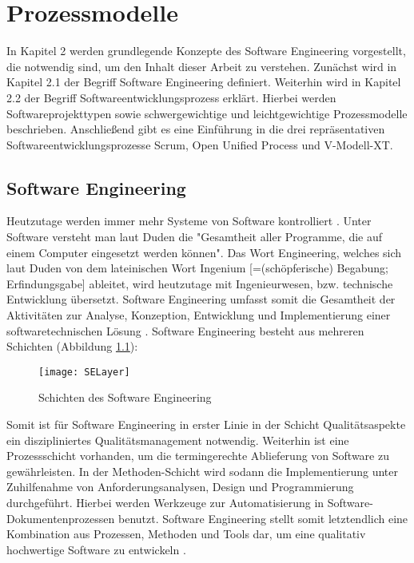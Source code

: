 \chapter{Prozessmodelle}\label{sec:chapter2}

In Kapitel 2 werden grundlegende Konzepte des Software Engineering vorgestellt, die notwendig sind, um den Inhalt dieser Arbeit zu verstehen. Zunächst wird in Kapitel 2.1 der Begriff Software Engineering definiert. Weiterhin wird in Kapitel 2.2 der Begriff Softwareentwicklungsprozess erklärt. Hierbei werden Softwareprojekttypen sowie schwergewichtige und leichtgewichtige Prozessmodelle beschrieben. Anschließend gibt es eine Einführung in die drei repräsentativen Softwareentwicklungsprozesse Scrum, Open Unified Process und V-Modell-XT.

\section{Software Engineering}\label{sec:chapter2: Software Engineering}
Heutzutage werden immer mehr Systeme von Software kontrolliert \cite{Puntambekar2007}. Unter Software versteht man laut Duden die "Gesamtheit aller Programme, die auf einem Computer eingesetzt werden können". Das Wort Engineering, welches sich laut Duden von dem lateinischen Wort Ingenium [=(schöpferische) Begabung; Erfindungsgabe] ableitet, wird heutzutage mit Ingenieurwesen, bzw. technische Entwicklung übersetzt. Software Engineering umfasst somit die Gesamtheit der Aktivitäten zur Analyse, Konzeption, Entwicklung und Implementierung einer softwaretechnischen Lösung \cite{Specker1998}.
Software Engineering besteht aus mehreren Schichten (Abbildung \ref{fig:SchichtenSE}):

\begin{figure}[htp]
\begin{center}
  \texttt{[image: SELayer]} %
  \caption{Schichten des Software Engineering \cite{Puntambekar2007}}
  \label{fig:SchichtenSE}
\end{center}
\end{figure}

Somit ist für Software Engineering in erster Linie in der Schicht Qualitätsaspekte ein diszipliniertes Qualitätsmanagement notwendig. Weiterhin ist eine Prozessschicht vorhanden, um die termingerechte Ablieferung von Software zu gewährleisten. In der Methoden-Schicht wird sodann die Implementierung unter Zuhilfenahme von Anforderungsanalysen, Design und Programmierung durchgeführt. Hierbei werden Werkzeuge zur Automatisierung in Software-Dokumentenprozessen benutzt. Software Engineering stellt somit letztendlich eine Kombination aus Prozessen, Methoden und Tools dar, um eine qualitativ hochwertige Software zu entwickeln \cite{Puntambekar2007}.

